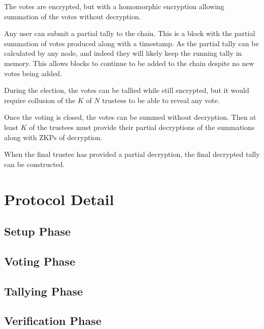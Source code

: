 {    The votes are encrypted, but with a homomorphic encryption allowing summation of the votes without decryption.

    Any user can submit a partial tally to the chain. This is a block with the partial summation of votes produced along with a timestamp. As the partial tally can be calculated by any node, and indeed they will likely keep the running tally in memory. This allows blocks to continue to be added to the chain despite no new votes being added.

    During the election, the votes can be tallied while still encrypted, but it would require collusion of the $K$ of $N$ trustees to be able to reveal any vote.

    Once the voting is closed, the votes can be summed without decryption. Then at least $K$ of the trustees must provide their partial decryptions of the summations along with ZKPs of decryption.

    When the final trustee has provided a partial decryption, the final decrypted tally can be constructed.
}

\section{Protocol Detail}
\label{ch:astris:detail}


\subsection{Setup Phase}
\label{ch:astris:detail:setup}


\subsection{Voting Phase}
\label{ch:astris:detail:vote}


\subsection{Tallying Phase}
\label{ch:astris:detail:tally}


\subsection{Verification Phase}
\label{ch:astris:detail:verify}

